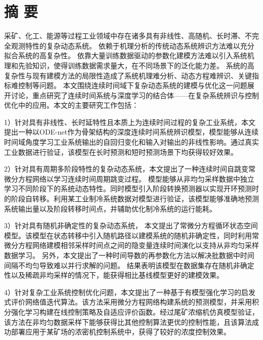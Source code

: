 
\chapter*{ 摘 \space 要 }

采矿、化工、能源等过程工业领域中存在诸多具有非线性、高随机、长时滞、不完全观测特性的复杂动态系统。
依赖于机理分析的传统动态系统辨识方法难以充分拟合系统的高复杂性。
依靠大量训练数据驱动的参数化建模方法难以引入系统机理和先验知识，使得训练数据需求量大，在不同场景下的泛化能力差。
系统的高复杂性与现有建模方法的局限性造成了系统机理难分析、动态方程难辨识、关键指标难控制等问题。
本文围绕连续时间域下复杂动态系统的建模与优化这一问题展开讨论，重点研究了连续时间系统与深度学习的结合体——在复杂系统辨识与控制优化中的应用。本文的主要研究工作包括：

1）针对具有非线性、长时延特性且本质上为连续时间过程的复杂工业系统，本文提出一种以ODE-net作为骨架结构的深度连续时间系统辨识模型，模型能够从连续时间域角度学习工业系统输出的自回归变化和输入对输出的非线性影响。通过真实工业数据进行验证，该模型在长时预测和短时预测场景下均获得较好效果。   

2）针对具有周期多阶段特性的复杂动态系统，本文提出了一种连续时间自跳变常微分方程网络以学习连续时间周期跳变过程。
模型能够从非均匀采样数据中独立学习不同阶段下的系统动态特性。同时模型引入阶段转换预测器以实现开环预测时的阶段自转移。利用某工业制冷系统数据对模型进行验证，该模型能够准确地预测系统输出量以及阶段转移时间点，并辅助优化制冷系统的运行能耗。

3）针对具有随机非确定性的复杂动态系统，
本文提出了常微分方程循环状态空间模型。该模型在状态转移中引入随机路径以建模系统的随机非确定性，同时利用常微分方程网络建模相邻采样时间点之间的隐变量连续时间演化以支持从非均匀采样数据学习。
另外，本文提出了一种时间导数的再参数化方法以解决批数据中时间间隔不均匀导致难以并行求解的问题。
结果表明该模型在数据集存在随机非确定性以及稀疏非均采样的情况下，能获得相比基线模型更好的建模效果。

4）针对复杂工业系统控制优化问题，本文提出了一种基于有模型强化学习的启发式评价网络值迭代算法。该方法采用微分方程网络构建系统的预测模型，并采用积分强化学习构建在线控制策略及自适应评价函数。经过尾矿浓缩机仿真模型验证，该方法在非均匀数据采样下能够获得比其他控制算法更优的控制性能，且该算法成功部署应用于某矿场的浓密机控制系统中，获得了较好的浓度控制效果。



